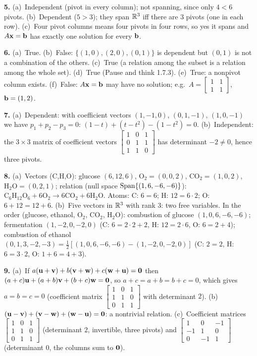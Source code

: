 \documentclass[11pt]{article}
\begin{document}
\begin{sol}
\textbf{5.} (a)~Independent (pivot in every column); not spanning, since only $4<6$ pivots. (b)~Dependent ($5>3$); they span $\mathbb{R}^3$ iff there are $3$ pivots (one in each row). (c)~Four pivot columns means four pivots in four rows, so yes it spans and $A\mathbf{x}=\mathbf{b}$ has exactly one solution for every $\mathbf{b}$.

\textbf{6.} (a)~True. (b)~False: $\{(1,0),(2,0),(0,1)\}$ is dependent but $(0,1)$ is not a combination of the others. (c)~True (a relation among the subset is a relation among the whole set). (d)~True (Pause and think 1.7.3). (e)~True: a nonpivot column exists. (f)~False: $A\mathbf{x}=\mathbf{b}$ may have no solution; e.g.\ $A=\begin{bmatrix}1&1\\1&1\end{bmatrix}$, $\mathbf{b}=(1,2)$.

\textbf{7.} (a)~Dependent: with coefficient vectors $(1,-1,0)$, $(0,1,-1)$, $(1,0,-1)$ we have $p_1+p_2-p_3=0$: $(1-t)+(t-t^2)-(1-t^2)=0$. (b)~Independent: the $3\times3$ matrix of coefficient vectors $\begin{bmatrix}1&0&1\\0&1&1\\1&1&0\end{bmatrix}$ has determinant $-2\neq0$, hence three pivots.

\textbf{8.} (a)~Vectors (C,H,O): glucose $(6,12,6)$, $\mathrm{O_2}=(0,0,2)$, $\mathrm{CO_2}=(1,0,2)$, $\mathrm{H_2O}=(0,2,1)$; relation (null space $\operatorname{Span}\{(1,6,-6,-6)\}$): $\mathrm{C_6H_{12}O_6}+6\mathrm{O_2}\to6\mathrm{CO_2}+6\mathrm{H_2O}$. Atoms: C: $6=6$; H: $12=6\cdot2$; O: $6+12=12+6$. (b)~Five vectors in $\mathbb{R}^3$ with rank $3$: two free variables. In the order (glucose, ethanol, $\mathrm{O_2}$, $\mathrm{CO_2}$, $\mathrm{H_2O}$): combustion of glucose $(1,0,6,-6,-6)$; fermentation $(1,-2,0,-2,0)$ (C: $6=2\cdot2+2$, H: $12=2\cdot6$, O: $6=2+4$); combustion of ethanol $(0,1,3,-2,-3)=\tfrac12[(1,0,6,-6,-6)-(1,-2,0,-2,0)]$ (C: $2=2$, H: $6=3\cdot2$, O: $1+6=4+3$).

\textbf{9.} (a)~If $a(\mathbf{u}+\mathbf{v})+b(\mathbf{v}+\mathbf{w})+c(\mathbf{w}+\mathbf{u})=\mathbf{0}$ then $(a+c)\mathbf{u}+(a+b)\mathbf{v}+(b+c)\mathbf{w}=\mathbf{0}$, so $a+c=a+b=b+c=0$, which gives $a=b=c=0$ (coefficient matrix $\begin{bmatrix}1&0&1\\1&1&0\\0&1&1\end{bmatrix}$ with determinant $2$). (b)~$(\mathbf{u}-\mathbf{v})+(\mathbf{v}-\mathbf{w})+(\mathbf{w}-\mathbf{u})=\mathbf{0}$: a nontrivial relation. (c)~Coefficient matrices $\begin{bmatrix}1&0&1\\1&1&0\\0&1&1\end{bmatrix}$ (determinant $2$, invertible, three pivots) and $\begin{bmatrix}1&0&-1\\-1&1&0\\0&-1&1\end{bmatrix}$ (determinant $0$, the columns sum to $\mathbf{0}$).
\end{sol}
\end{document}
